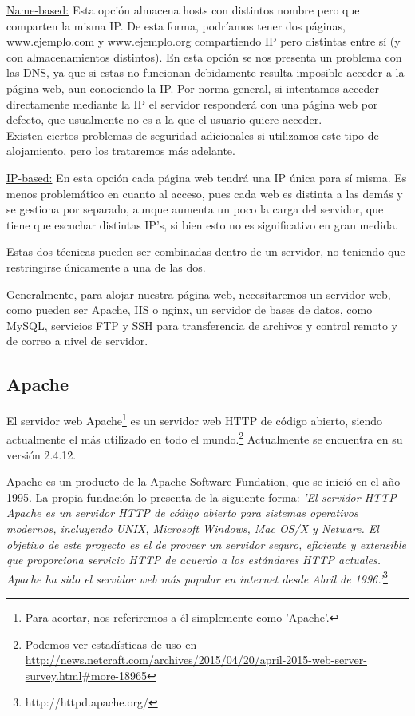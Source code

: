 \documentclass[a4paper, 10pt]{article} %
\begin{document}
\underline{Name-based:} Esta opción almacena hosts con distintos nombre pero que comparten la misma IP. De esta forma, podríamos tener dos páginas, www.ejemplo.com y www.ejemplo.org compartiendo IP pero distintas entre sí (y con almacenamientos distintos). En esta opción se nos presenta un problema con las DNS, ya que si estas no funcionan debidamente resulta imposible acceder a la página web, aun conociendo la IP. Por norma general, si intentamos acceder directamente mediante la IP el servidor responderá con una página web por defecto, que usualmente no es a la que el usuario quiere acceder. \\
Existen ciertos problemas de seguridad adicionales si utilizamos este tipo de alojamiento, pero los trataremos más adelante. 

\underline{IP-based:} En esta opción cada página web tendrá una IP única para sí misma. Es menos problemático en cuanto al acceso, pues cada web es distinta a las demás y se gestiona por separado, aunque aumenta un poco la carga del servidor, que tiene que escuchar distintas IP's, si bien esto no es significativo en gran medida. 

Estas dos técnicas pueden ser combinadas dentro de un servidor, no teniendo que restringirse únicamente a una de las dos. 

Generalmente, para alojar nuestra página web, necesitaremos un servidor web, como pueden ser Apache, IIS o nginx, un servidor de bases de datos, como MySQL, servicios FTP y SSH para transferencia de archivos y control remoto y de correo a nivel de servidor. 

\subsection{Apache}

El servidor web Apache\footnote{Para acortar, nos referiremos a él simplemente como 'Apache'.} es un servidor web HTTP de código abierto, siendo actualmente el más utilizado en todo el mundo.\footnote{Podemos ver estadísticas de uso en \url{http://news.netcraft.com/archives/2015/04/20/april-2015-web-server-survey.html\#more-18965}} Actualmente se encuentra en su versión 2.4.12. 

Apache es un producto de la Apache Software Fundation, que se inició en el año 1995. La propia fundación lo presenta de la siguiente forma: \textit{'El servidor HTTP Apache es un servidor HTTP de código abierto para sistemas operativos modernos, incluyendo UNIX, Microsoft Windows, Mac OS/X y Netware. El objetivo de este proyecto es el de proveer un servidor seguro, eficiente y extensible que proporciona servicio HTTP de acuerdo a los estándares HTTP actuales. Apache ha sido el servidor web más popular en internet desde Abril de 1996.'}\footnote{http://httpd.apache.org/}
\end{document}
